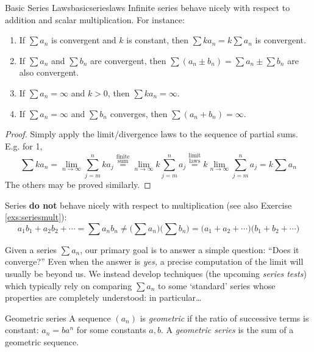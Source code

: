 \begin{thm}{Basic Series Laws}{basicserieslaws}
	Infinite series behave nicely with respect to addition and scalar multiplication. For instance:
	\begin{enumerate}\itemsep2pt
	  \item If $\sum a_n$ is convergent and $k$ is constant, then $\sum ka_n=k\sum a_n$ is convergent.
	  \item If $\sum a_n$ and $\sum b_n$ are convergent, then $\sum(a_n\pm b_n)=\sum a_n\pm\sum b_n$ are also convergent.
	  \item If $\sum a_n=\infty$ and $k>0$, then $\sum ka_n=\infty$.
	  \item If $\sum a_n=\infty$ and $\sum b_n$ converges, then $\sum(a_n+b_n)=\infty$.
	\end{enumerate}
\end{thm}

\begin{proof}
	Simply apply the limit/divergence laws to the sequence of partial sums. E.g.{} for 1,
	\[
	  \sum ka_n = \lim_{n\to\infty}\sum_{j=m}^nka_j \overset{\text{finite}}{\overset{\text{sum}}{=}} 
	  \lim_{n\to\infty}k\sum_{j=m}^na_j \overset{\text{limit}}{\overset{\text{laws}}{=}}
	  k\lim_{n\to\infty}\sum_{j=m}^na_j =k\sum a_n
	\]
	The others may be proved similarly.
\end{proof}


Series \textbf{do not} behave nicely with respect to multiplication (see also Exercise \ref{exs:seriesmult}):
\[
	a_1b_1+a_2b_2+\cdots 
	=\sum a_nb_n\neq \bigl(\sum a_n\bigr)\bigl(\sum b_n\bigr) 
	=\bigl(a_1+a_2+\cdots\bigr)\bigl(b_1+b_2+\cdots\bigr)
\]

\goodbreak



Given a series $\sum a_n$, our primary goal is to answer a simple question: ``Does it converge?'' Even when the answer is \emph{yes,} a precise computation of the limit will usually be beyond us. We instead develop techniques (the upcoming \emph{series tests}) which typically rely on comparing $\sum a_n$ to some `standard' series whose properties are completely understood: in particular\ldots

\begin{defn}{Geometric series}{}
	A sequence $(a_n)$ is \emph{geometric} if the ratio of successive terms is constant: $a_n=ba^n$ for some constants $a,b$. A \emph{geometric series} is the sum of a geometric sequence. 
\end{defn}

